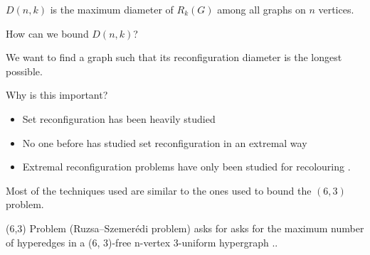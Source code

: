 
\begin{frame}
\vspace{-3em}
    \begin{figure}
        \centering
        
    \end{figure}
    \vspace{-4em}
    \begin{fact}{\(D(n,k)\)}
        is the maximum diameter of \(R_k(G)\) among all graphs on \(n\) vertices.
    \end{fact}
    \vspace{1em}
    \pause
    \begin{center}
        \large \textcolor{cfred}{How can we bound \(D(n,k)\)?} 
    \end{center}
    We want to find a graph such that its reconfiguration diameter is the longest possible.
\end{frame}


\begin{frame}{Why is this important?}
    \begin{itemize}
        \item Set reconfiguration has been heavily studied
        \item No one before has studied set reconfiguration in an extremal way 
        \item Extremal reconfiguration problems have only been studied for recolouring \framemark.
    \end{itemize}
    \vspace{1em}
    \pause
    Most of the techniques used are similar to the ones used to bound the \((6,3)\) problem.
    
    \begin{heading}{(6,3) Problem}
    (Ruzsa–Szemerédi problem) asks for asks for the maximum number of hyperedges in a (6, 3)-free n-vertex 3-uniform hypergraph \framemark..
    \end{heading}
\vspace{-1em}
\end{frame}